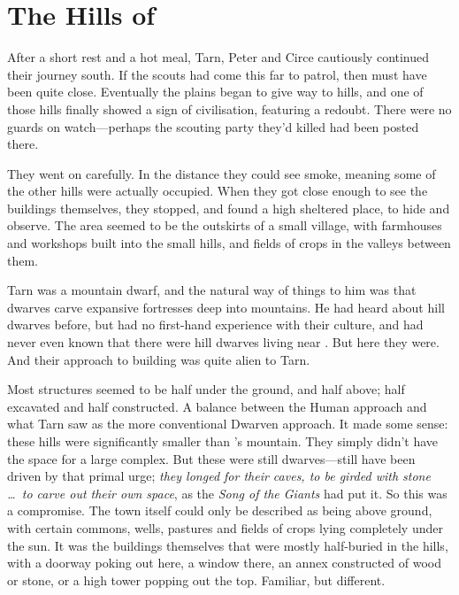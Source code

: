 \chapter{The Hills of \tholkunrond}

After a short rest and a hot meal, Tarn, Peter and Circe cautiously continued their journey south.  If the scouts had come this far to patrol, then \tholkunrond must have been quite close.  Eventually the plains began to give way to hills, and one of those hills finally showed a sign of civilisation, featuring a redoubt.  There were no guards on watch---perhaps the scouting party they'd killed had been posted there.

They went on carefully.  In the distance they could see smoke, meaning some of the other hills were actually occupied.  When they got close enough to see the buildings themselves, they stopped, and found a high sheltered place, to hide and observe.  The area seemed to be the outskirts of a small village, with farmhouses and workshops built into the small hills, and fields of crops in the valleys between them.

Tarn was a mountain dwarf, and the natural way of things to him was that dwarves carve expansive fortresses deep into mountains.  He had heard about hill dwarves before, but had no first-hand experience with their culture, and had never even known that there were hill dwarves living near \korbarthrond.  But here they were.  And their approach to building was quite alien to Tarn.

Most structures seemed to be half under the ground, and half above; half excavated and half constructed.  A balance between the Human approach and what Tarn saw as the more conventional Dwarven approach.  It made some sense: these hills were significantly smaller than \korbarthrond's mountain.  They simply didn't have the space for a large complex.  But these were still dwarves---still have been driven by that primal urge; \emph{they longed for their caves, to be girded with stone \ldots\ to carve out their own space}, as the \emph{Song of the Giants} had put it.  So this was a compromise.  The town itself could only be described as being above ground, with certain commons, wells, pastures and fields of crops lying completely under the sun.  It was the buildings themselves that were mostly half-buried in the hills, with a doorway poking out here, a window there, an annex constructed of wood or stone, or a high tower popping out the top.  Familiar, but different.

